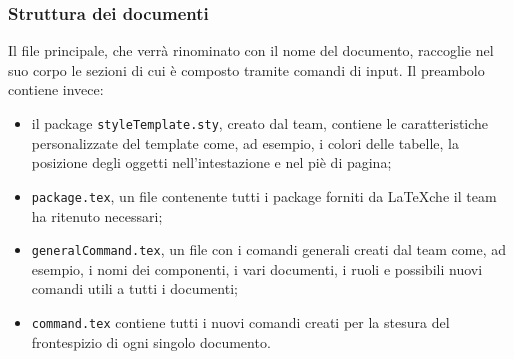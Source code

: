 \subsubsection{Struttura dei documenti}
Il file principale, che verrà rinominato con il nome del documento, raccoglie nel suo corpo le sezioni di cui è composto tramite comandi di input. Il preambolo contiene invece:
\begin{itemize}
	\item il package \texttt{styleTemplate.sty}, creato dal team, contiene le caratteristiche personalizzate del template come, ad esempio, i colori delle tabelle, la posizione degli oggetti nell'intestazione e nel piè di pagina;
	\item \texttt{package.tex}, un file contenente tutti i package forniti da \LaTeX che il team ha ritenuto necessari;
	\item \texttt{generalCommand.tex}, un file con i comandi generali creati dal team come, ad esempio, i nomi dei componenti, i vari documenti, i ruoli e possibili nuovi comandi utili a tutti i documenti;
	\item \texttt{command.tex} contiene tutti i nuovi comandi creati per la stesura del frontespizio di ogni singolo documento.
\end{itemize}

